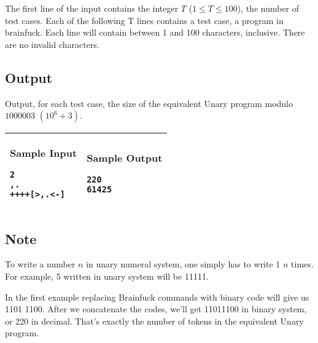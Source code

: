 The first line of the input contains the integer $T$ ($1 \leq T \leq 100$),
the number of test cases.
Each of the following T lines contains a test case, a program in brainfuck.
Each line will contain between 1 and 100 characters, inclusive. There are no
invalid characters.

\subsection*{Output}

Output, for each test case, the size of the equivalent Unary program modulo
$1000003$ $(10^6 + 3)$.

\begin{table}[!h]
\centering
\begin{tabular}{|l|l|}
\hline
\begin{minipage}[t]{3in}
\textbf{Sample Input}
\begin{verbatim}
2
,.
++++[>,.<-]
\end{verbatim}
\vspace{1mm}
\end{minipage}
&

\begin{minipage}[t]{3in}
\textbf{Sample Output}
\begin{verbatim}
220
61425
\end{verbatim}
\vspace{1mm}
\end{minipage} \\
\hline
\end{tabular}
\end{table}

\subsection*{Note}

To write a number $n$ in unary numeral system, one simply has to write 1 $n$
times. For example, 5 written in unary system will be 11111.

In the first example replacing Brainfuck commands with binary code will give us
1101 1100. After we concatenate the codes, we'll get 11011100 in binary system,
     or 220 in decimal. That's exactly the number of tokens in the equivalent
     Unary program.

\newpage
